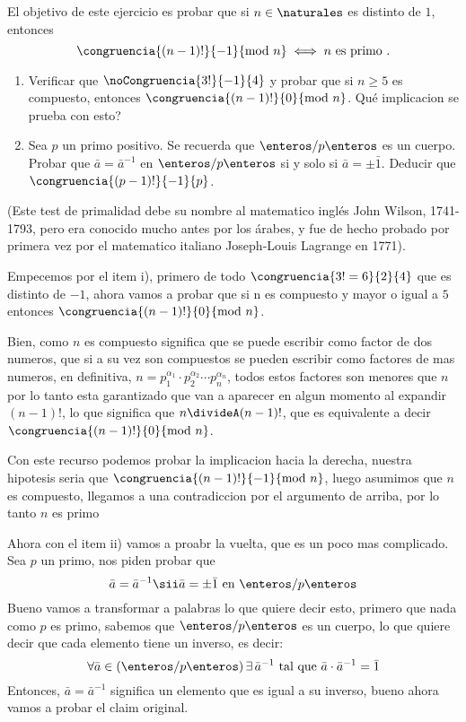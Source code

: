 \begin{enunciado}{\ejercicio}
  El objetivo de este ejercicio es probar que si $n \in \naturales$ es distinto de $1$, entonces
  $$
   \congruencia{(n-1)!}{-1}{\text{mod } n} \iff n \text{ es primo .}
  $$
  \begin{enumerate}[label=\roman*)]
  \item    
  Verificar que $\noCongruencia{3!}{-1}{4}$ y probar que si $n \geq 5$ es compuesto, entonces 
  $\congruencia{(n-1)!}{0}{\text{mod } n}$. Qué implicacion se prueba con esto?

  \item
  Sea $p$ un primo positivo. Se recuerda que $\enteros/p\enteros$ es un cuerpo. Probar que 
  $\bar{a} = \bar{a}^{-1}$ en $\enteros/p\enteros$ si y solo si $\bar{a} = \pm \bar{1}$. 
  Deducir que $\congruencia{(p - 1)!}{-1}{p}$.
  \end{enumerate}

  (Este test de primalidad debe su nombre al matematico inglés John Wilson, 1741-1793, pero era conocido
  mucho antes por los árabes, y fue de hecho probado por primera vez por el matematico italiano 
  Joseph-Louis Lagrange en 1771).
\end{enunciado}

Empecemos por el item i), primero de todo $\congruencia{3! = 6}{2}{4}$ que es distinto de $-1$, ahora vamos a probar que si 
n es compuesto y mayor o igual a $5$ entonces $\congruencia{(n-1)!}{0}{\text{mod } n}$. 
\medskip

Bien, como $n$ es compuesto significa que se puede escribir como factor de dos numeros, que si a su vez son compuestos 
se pueden escribir como factores de mas numeros, en definitiva, $n = p_1^{\alpha_1} \cdot  p_2^{\alpha_2} \cdots  p_n^{\alpha_n}$,
todos estos factores son menores que $n$ por lo tanto esta garantizado que van a aparecer en algun momento al expandir $(n-1)!$, lo que significa que
$n \divideA (n-1)!$, que es equivalente a decir $\congruencia{(n-1)!}{0}{\text{mod } n}$.

Con este recurso podemos probar la implicacion hacia la derecha, nuestra hipotesis seria que $\congruencia{(n-1)!}{-1}{\text{mod } n}$, luego asumimos que $n$
es compuesto, llegamos a una contradiccion por el argumento de arriba, por lo tanto $n$ es primo
\medskip 

Ahora con el item ii) vamos a proabr la vuelta, que es un poco mas complicado. Sea $p$ un primo, nos piden probar que 
$$
\bar{a} = \bar{a}^{-1} \sii \bar{a} = \pm \bar{1} \text{ en } \enteros/p\enteros
$$
Bueno vamos a transformar a palabras lo que quiere decir esto, primero que nada como $p$ es primo, sabemos que $\enteros/p\enteros$ es 
un cuerpo, lo que quiere decir que cada elemento tiene un inverso, es decir:
$$\forall \bar{a} \in (\enteros/p\enteros) \, \exists \, \bar{a}^{-1} \text{ tal que } \bar{a}\cdot\bar{a}^{-1} = \bar{1}
$$
Entonces, $\bar{a} = \bar{a}^{-1}$ significa un elemento que es igual a su inverso, bueno ahora vamos a probar el claim original.


